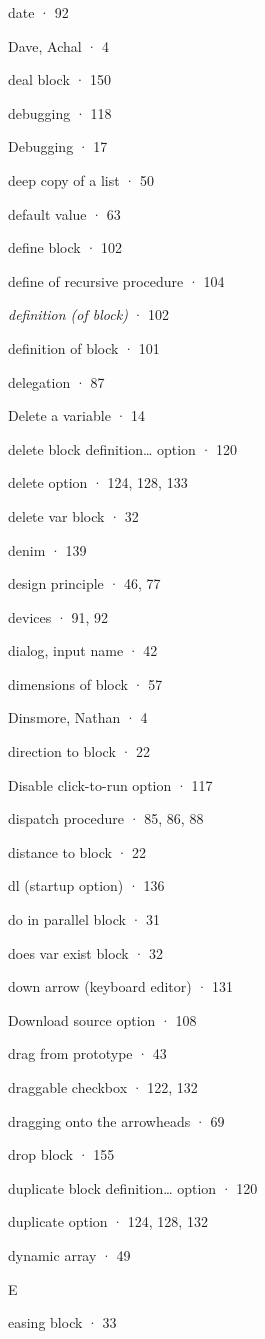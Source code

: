 \documentclass[
  letterpaper,
]{book}
\begin{document}
date · 92

Dave, Achal · 4

deal block · 150

debugging · 118

Debugging · 17

deep copy of a list · 50

default value · 63

define block · 102

define of recursive procedure · 104

\emph{definition (of block)} · 102

definition of block · 101

delegation · 87

Delete a variable · 14

delete block definition\ldots{} option · 120

delete option · 124, 128, 133

delete var block · 32

denim · 139

design principle · 46, 77

devices · 91, 92

dialog, input name · 42

dimensions of block · 57

Dinsmore, Nathan · 4

direction to block · 22

Disable click-to-run option · 117

dispatch procedure · 85, 86, 88

distance to block · 22

dl (startup option) · 136

do in parallel block · 31

does var exist block · 32

down arrow (keyboard editor) · 131

Download source option · 108

drag from prototype · 43

draggable checkbox · 122, 132

dragging onto the arrowheads · 69

drop block · 155

duplicate block definition\ldots{} option · 120

duplicate option · 124, 128, 132

dynamic array · 49

E

easing block · 33
\end{document}
